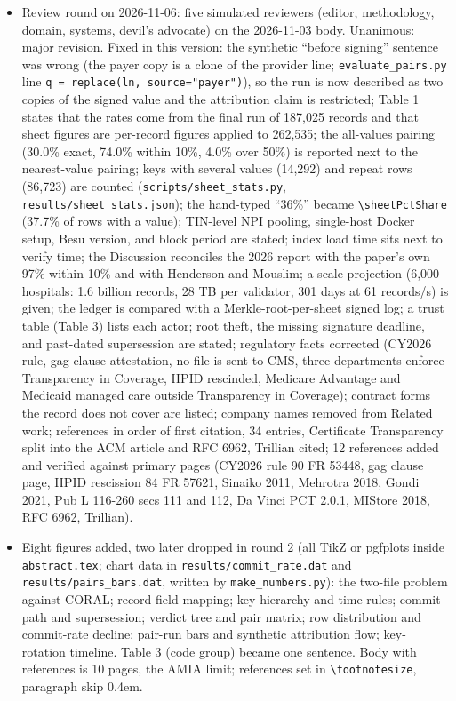 \begin{itemize}
\item Review round on 2026-11-06: five simulated reviewers (editor, methodology, domain, systems, devil's advocate) on the 2026-11-03 body. Unanimous: major revision. Fixed in this version: the synthetic ``before signing'' sentence was wrong (the payer copy is a clone of the provider line; \texttt{evaluate\_pairs.py} line \texttt{q = replace(ln, source="payer")}), so the run is now described as two copies of the signed value and the attribution claim is restricted; Table 1 states that the rates come from the final run of 187,025 records and that sheet figures are per-record figures applied to 262,535; the all-values pairing (30.0\% exact, 74.0\% within 10\%, 4.0\% over 50\%) is reported next to the nearest-value pairing; keys with several values (14,292) and repeat rows (86,723) are counted (\texttt{scripts/sheet\_stats.py}, \texttt{results/sheet\_stats.json}); the hand-typed ``36\%'' became \texttt{\textbackslash sheetPctShare} (37.7\% of rows with a value); TIN-level NPI pooling, single-host Docker setup, Besu version, and block period are stated; index load time sits next to verify time; the Discussion reconciles the 2026 report with the paper's own 97\% within 10\% and with Henderson and Mouslim; a scale projection (6,000 hospitals: 1.6 billion records, 28 TB per validator, 301 days at 61 records/s) is given; the ledger is compared with a Merkle-root-per-sheet signed log; a trust table (Table 3) lists each actor; root theft, the missing signature deadline, and past-dated supersession are stated; regulatory facts corrected (CY2026 rule, gag clause attestation, no file is sent to CMS, three departments enforce Transparency in Coverage, HPID rescinded, Medicare Advantage and Medicaid managed care outside Transparency in Coverage); contract forms the record does not cover are listed; company names removed from Related work; references in order of first citation, 34 entries, Certificate Transparency split into the ACM article and RFC 6962, Trillian cited; 12 references added and verified against primary pages (CY2026 rule 90 FR 53448, gag clause page, HPID rescission 84 FR 57621, Sinaiko 2011, Mehrotra 2018, Gondi 2021, Pub L 116-260 secs 111 and 112, Da Vinci PCT 2.0.1, MIStore 2018, RFC 6962, Trillian).
\item Eight figures added, two later dropped in round 2 (all TikZ or pgfplots inside \texttt{abstract.tex}; chart data in \texttt{results/commit\_rate.dat} and \texttt{results/pairs\_bars.dat}, written by \texttt{make\_numbers.py}): the two-file problem against CORAL; record field mapping; key hierarchy and time rules; commit path and supersession; verdict tree and pair matrix; row distribution and commit-rate decline; pair-run bars and synthetic attribution flow; key-rotation timeline. Table 3 (code group) became one sentence. Body with references is 10 pages, the AMIA limit; references set in \texttt{\textbackslash footnotesize}, paragraph skip 0.4em.

\end{itemize}
